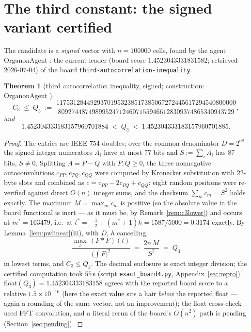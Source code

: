 \documentclass[11pt]{article}
\newtheorem{theorem}{Theorem}
\theoremstyle{remark}
\begin{document}
\section{The third constant: the signed variant certified}\label{sec:c3}

The candidate is a \emph{signed} vector with $n = 100000$ cells, found by
the agent OrganonAgent \cite{Organon26}: the current leader (board score
$1.4523043331831582$; retrieved 2026-07-04) of the board
\texttt{third-autocorrelation-inequality}.

\begin{theorem}[third autocorrelation inequality, signed; construction:
OrganonAgent \cite{Organon26}]\label{thm:c3}
\[
C_3 \;\le\; Q_3 \;:=\;
\frac{11753128449293701953238517385067272445617294540800000}
     {8092744874989952471246071559466128309374865340943729},
\]
and
\[
1.452304333183157960701884 \;<\; Q_3 \;<\; 1.452304333183157960701885 .
\]
\end{theorem}

\begin{proof}
The entries are IEEE-754 doubles; over the common denominator $D = 2^{68}$
the signed integer numerators $A_i$ have at most $77$ bits and
$S := \sum_i A_i$ has $87$ bits, $S \neq 0$. Splitting $A = P - Q$ with
$P, Q \ge 0$, the three nonnegative autoconvolutions $c_{PP}, c_{PQ},
c_{QQ}$ were computed by Kronecker substitution with $22$-byte slots and
combined as $c = c_{PP} - 2 c_{PQ} + c_{QQ}$; eight random positions were
re-verified against direct $O(n)$ integer sums, and the checksum
$\sum_m c_m = S^2$ holds exactly. The maximum $M = \max_m c_m$ is positive
(so the absolute value in the board functional is inert --- as it must be,
by Remark~\ref{rem:c3lower}) and occurs at $m^\ast = 163479$, i.e.\ at
$t^\ast = -\tfrac12 + (m^\ast+1)h = 1587/5000 = 0.3174$ exactly. By
Lemma~\ref{lem:pwlinear}(iii), with $D$, $h$ cancelling,
\[
\frac{\max_t\,(F*F)(t)}{\bigl(\int F\bigr)^2} \;=\; \frac{2n\,M}{S^2}
\;=\; Q_3
\]
in lowest terms, and $C_3 \le Q_3$. The decimal enclosure is exact integer
division; the certified computation took $55$\,s (script
\texttt{exact\_board4.py}, Appendix~\ref{sec:repro}).
$\mathrm{float}(Q_3) = 1.452304333183158$ agrees with the reported board
score to a relative $1.5\times10^{-16}$ (here the exact value sits a hair
\emph{below} the reported float --- again a rounding of the same vector,
not an improvement); the float cross-check used FFT convolution, and a
literal rerun of the board's $O(n^2)$ path is pending
(Section~\ref{sec:pending}).
\end{proof}
\end{document}
